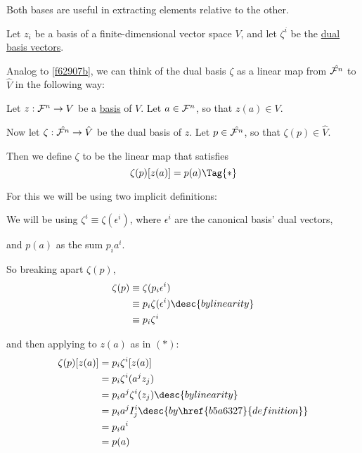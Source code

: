 Both bases are useful in extracting elements relative to the other.

\label{d29c8ad}

\cvn Let $z_i$ be a basis of a finite-dimensional vector space $V$, and let
$\zeta^i$ be the \href{b5a6327}{dual basis vectors}.

Analog to \autoref{f62907b}, we can think of the dual basis $\zeta$ as a linear
map from $\hat{\mathcal F^n}$ to $\hat V$ in the following way:

Let $z:\mathcal F^n\to V$ be a \href{f62907b}{basis} of $V$. Let $a\in\mathcal F^n$, so that
$z(a)\in V$.

Now let $\zeta:\hat{\mathcal F^n}\to\hat V$ be the dual basis of $z$. Let
$p\in\hat{\mathcal F^n}$, so that $\zeta(p)\in\hat V$.

Then we define $\zeta$ to be the linear map that satisfies
\begin{equation*}
  \zeta(p)[z(a)]=p(a)\Tag{*}
\end{equation*}

For this we will be using two implicit definitions:
\begin{enumerati}
  \item We will be using $\zeta^i\equiv\zeta(\epsilon^i)$, where $\epsilon^i$
        are the canonical basis' dual vectors,
  \item and $p(a)$ as the sum $p_ia^i$.
\end{enumerati}

So breaking apart $\zeta(p)$,
\begin{align*}
  \zeta(p) &\equiv\zeta(p_i\epsilon^i)                     \\
           &\equiv p_i\zeta(\epsilon^i)\desc{by linearity} \\
           &\equiv p_i\zeta^i
\end{align*}

and then applying to $z(a)$ as in $(*)$:
\begin{align*}
  \zeta(p)[z(a)] &=p_i\zeta^i[z(a)]                                \\
                 &=p_i\zeta^i(a^jz_j)                              \\
                 &=p_ia^j\zeta^i(z_j)\desc{by linearity}           \\
                 &=p_ia^jI^i_j\desc{by \href{b5a6327}{definition}} \\
                 &=p_ia^i                                          \\
                 &=p(a)
\end{align*}


